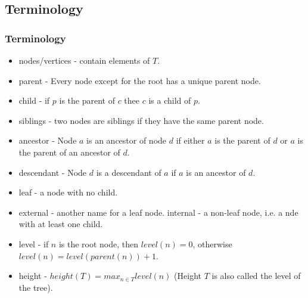 \documentclass{beamer}
\begin{document}
\subsection{Terminology}
\begin{frame}
\frametitle{Terminology}
\begin{itemize}
\item {\color{blue} nodes/vertices} - contain elements of $T$.
\item {\color{blue} parent} - Every node except for the root has a unique parent node.
\item {\color{blue} child} - if $p$ is the parent of $c$ thee $c$ is a child of $p$.
\item {\color{blue} siblings} - two nodes are siblings if they have the same parent node.
\item {\color{blue} ancestor} - Node $a$ is an ancestor of node $d$ if either $a$ is the parent of $d$ or $a$ is the parent of an ancestor of $d$.
\item {\color{blue} descendant} - Node $d$ is a descendant of $a$ if $a$ is an ancestor of $d$.
\item {\color{blue} leaf} - a node with no child.
\item {\color{blue} external} - another name for a leaf node.
{\color{blue} internal} - a non-leaf node, i.e. a nde with  at least one child.
\item {\color{blue} level} - if $n$ is the root node, then $level(n) = 0$, otherwise $level(n) = level(parent(n))+1$.
\item {\color{blue} height} - $height(T)=max_{n \in T}level(n)$ (Height $T$ is also called the level of the tree).
\end{itemize}
\end{frame}
\end{document}
